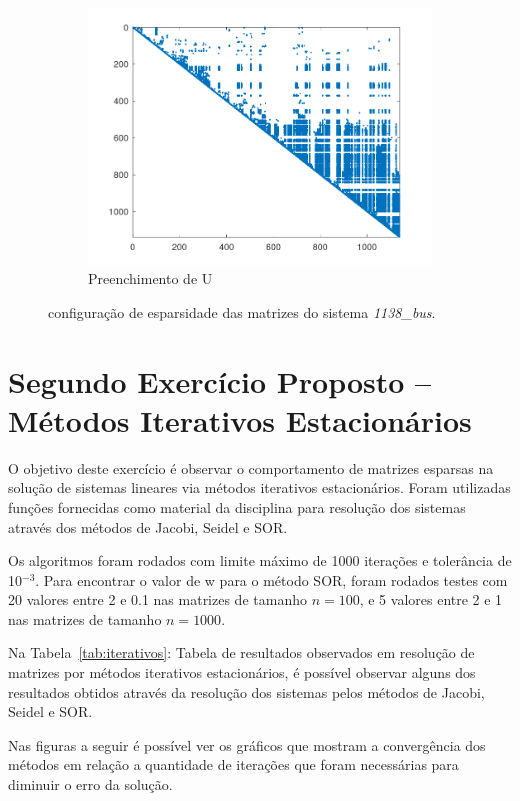 \documentclass{article}
\begin{document}
\begin{figure}[H]
\begin{subfigure}[b]{0.3\textwidth}
         \centering
         \includegraphics[width=\textwidth]{image/1138_bus_spyU.png}
         \caption{Preenchimento de U}
         \label{fig:bus-spyU}
    \end{subfigure}
    \hfill
    \caption{configuração de esparsidade das matrizes do sistema \textit{1138\_bus}.}
    \label{fig:bus}
\end{figure}

\section{Segundo Exercício Proposto -- Métodos Iterativos Estacionários}
\label{sec:iterativos}
O objetivo deste exercício é observar o comportamento de matrizes esparsas na solução de sistemas lineares via métodos iterativos estacionários. Foram utilizadas funções fornecidas como material da disciplina para resolução dos sistemas através dos métodos de Jacobi, Seidel e SOR.

Os algoritmos foram rodados com limite máximo de 1000 iterações e tolerância de 10$^{-3}$. Para encontrar o valor de w para o método SOR, foram rodados testes com 20 valores entre 2 e 0.1 nas matrizes de tamanho $n=100$, e 5 valores entre 2 e 1 nas matrizes de tamanho $n=1000$.

Na Tabela~\ref{tab:iterativos}: Tabela de resultados observados em resolução de matrizes por métodos iterativos estacionários, é possível observar alguns dos resultados obtidos através da resolução dos sistemas pelos métodos de Jacobi, Seidel e SOR.

Nas figuras a seguir é possível ver os gráficos que mostram a convergência dos métodos em relação a quantidade de iterações que foram necessárias para diminuir o erro da solução. 
\end{document}
